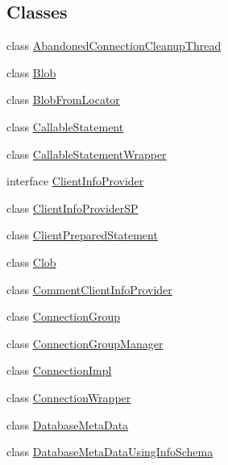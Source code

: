 \subsection*{Classes}
\begin{DoxyCompactItemize}
\item 
class \mbox{\hyperlink{classcom_1_1mysql_1_1cj_1_1jdbc_1_1_abandoned_connection_cleanup_thread}{Abandoned\+Connection\+Cleanup\+Thread}}
\item 
class \mbox{\hyperlink{classcom_1_1mysql_1_1cj_1_1jdbc_1_1_blob}{Blob}}
\item 
class \mbox{\hyperlink{classcom_1_1mysql_1_1cj_1_1jdbc_1_1_blob_from_locator}{Blob\+From\+Locator}}
\item 
class \mbox{\hyperlink{classcom_1_1mysql_1_1cj_1_1jdbc_1_1_callable_statement}{Callable\+Statement}}
\item 
class \mbox{\hyperlink{classcom_1_1mysql_1_1cj_1_1jdbc_1_1_callable_statement_wrapper}{Callable\+Statement\+Wrapper}}
\item 
interface \mbox{\hyperlink{interfacecom_1_1mysql_1_1cj_1_1jdbc_1_1_client_info_provider}{Client\+Info\+Provider}}
\item 
class \mbox{\hyperlink{classcom_1_1mysql_1_1cj_1_1jdbc_1_1_client_info_provider_s_p}{Client\+Info\+Provider\+SP}}
\item 
class \mbox{\hyperlink{classcom_1_1mysql_1_1cj_1_1jdbc_1_1_client_prepared_statement}{Client\+Prepared\+Statement}}
\item 
class \mbox{\hyperlink{classcom_1_1mysql_1_1cj_1_1jdbc_1_1_clob}{Clob}}
\item 
class \mbox{\hyperlink{classcom_1_1mysql_1_1cj_1_1jdbc_1_1_comment_client_info_provider}{Comment\+Client\+Info\+Provider}}
\item 
class \mbox{\hyperlink{classcom_1_1mysql_1_1cj_1_1jdbc_1_1_connection_group}{Connection\+Group}}
\item 
class \mbox{\hyperlink{classcom_1_1mysql_1_1cj_1_1jdbc_1_1_connection_group_manager}{Connection\+Group\+Manager}}
\item 
class \mbox{\hyperlink{classcom_1_1mysql_1_1cj_1_1jdbc_1_1_connection_impl}{Connection\+Impl}}
\item 
class \mbox{\hyperlink{classcom_1_1mysql_1_1cj_1_1jdbc_1_1_connection_wrapper}{Connection\+Wrapper}}
\item 
class \mbox{\hyperlink{classcom_1_1mysql_1_1cj_1_1jdbc_1_1_database_meta_data}{Database\+Meta\+Data}}
\item 
class \mbox{\hyperlink{classcom_1_1mysql_1_1cj_1_1jdbc_1_1_database_meta_data_using_info_schema}{Database\+Meta\+Data\+Using\+Info\+Schema}}

\end{DoxyCompactItemize}
